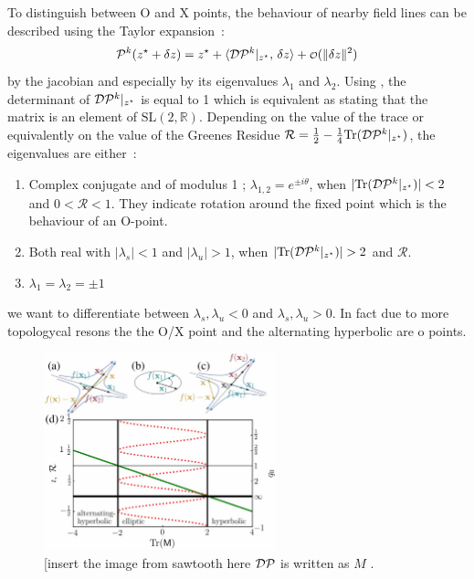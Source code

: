 To distinguish between O and X points, the behaviour of nearby field lines can be described using the Taylor expansion~:
\begin{equation*}
    \pmap^k(\z^\star+\delta \z) = \z^\star + \langle\dpmap^k\vert_{\z^\star},\, \delta\z\rangle + \smallO(\Vert\delta\z\Vert^2)
\end{equation*}
by the jacobian and especially by its eigenvalues $\lambda_1$ and $\lambda_2$. Using , the determinant of $\mathcal{D}\mathcal{P}^k\vert_{z^\star}$  is equal to 1 which is equivalent as stating that the matrix is an element of $\text{SL}(2,\mathbb{R})$. Depending on the value of the trace or equivalently on the value of the Greenes Residue $\mathcal{R} = \frac{1}{2} - \frac{1}{4}\text{Tr}(\mathcal{D}\mathcal{P}^k\vert_{z^\star})$, the eigenvalues are either~:
\begin{enumerate}
    \item Complex conjugate and of modulus 1 ; $\lambda_{1,2} = e^{\pm i\theta}$, when $\vert \text{Tr}(\mathcal{D}\mathcal{P}^k\vert_{z^\star})\vert < 2$ and $0 < \mathcal{R} < 1$. They indicate rotation around the fixed point which is the behaviour of an O-point.
    \item Both real with $\vert\lambda_s\vert < 1$ and $\vert\lambda_u\vert > 1$, when $\vert \text{Tr}(\mathcal{D}\mathcal{P}^k\vert_{z^\star})\vert > 2$ and $\mathcal{R}$.
    \item $\lambda_1 = \lambda_2 = \pm 1$
\end{enumerate}

we want to differentiate between $\lambda_s, \lambda_u < 0$ and $\lambda_s, \lambda_u > 0$. In fact due to more topologycal resons the the O/X point and the alternating hyperbolic are o points.

\begin{figure}[H]
    \centering
    \includegraphics[width=0.6\textwidth]{images/theory/smeit_sawtooth.jpg}
    \caption{[insert the image from sawtooth here $\mathcal{D}\mathcal{P}$ is written as $M$ \cite{smiet_bifurcations_2020}.}
    \label{fig:enter-label}
\end{figure}


